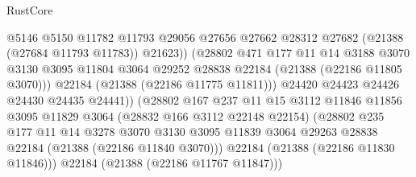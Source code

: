 \begin{lexlean}{RustCore}
\begin{coremodule}
                                    @5146
                                    @5150
                                    @11782
                                    @11793
                                    @29056
                                    @27656
                                    @27662
                                    @28312
                                    @27682
                                    (@21388 (@27684 @11793 @11783))
                                    @21623))
                                (@28802
                                  @471
                                  @177
                                  @11
                                  @14
                                  @3188
                                  @3070
                                  @3130
                                  @3095
                                  @11804
                                  @3064
                                  @29252
                                  @28838
                                  @22184
                                  (@21388 (@22186 @11805 @3070)))
                                @22184
                                (@21388 (@22186 @11775 @11811)))
                              @24420
                              @24423
                              @24426
                              @24430
                              @24435
                              @24441))
                          (@28802
                            @167
                            @237
                            @11
                            @15
                            @3112
                            @11846
                            @11856
                            @3095
                            @11829
                            @3064
                            (@28832 @166 @3112 @22148 @22154)
                            (@28802
                              @235
                              @177
                              @11
                              @14
                              @3278
                              @3070
                              @3130
                              @3095
                              @11839
                              @3064
                              @29263
                              @28838
                              @22184
                              (@21388 (@22186 @11840 @3070)))
                            @22184
                            (@21388 (@22186 @11830 @11846)))
                          @22184
                          (@21388 (@22186 @11767 @11847)))

\end{coremodule}
\end{lexlean}
